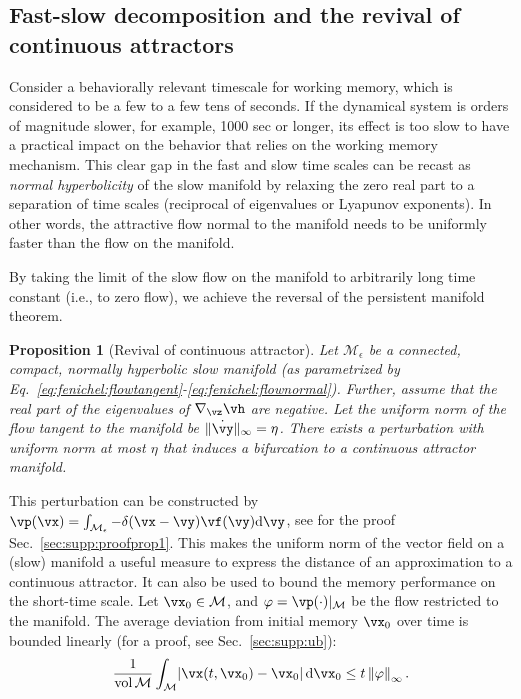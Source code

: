 \documentclass{article} %
\newcounter{ct}
\newcommand{\dm}[1]{\ensuremath{\mathrm{d}{#1}}} %
\newcommand{\manifold}{\mathcal{M}}
\newcommand{\uniformNorm}[1]{\left\|#1\right\|_\infty} %
\DeclarePairedDelimiter{\abs}{\lvert}{\rvert}
\newtheorem{prop}{Proposition}
\theoremstyle{definition}
\theoremstyle{remark}
\begin{document}
\subsection{Fast-slow decomposition and the revival of continuous attractors}\label{sec:revival}
Consider a behaviorally relevant  timescale for working memory, which is considered to be a few to a few tens of seconds.
If the dynamical system is orders of magnitude slower, for example, 1000 sec or longer, its effect is too slow to have a practical impact on the behavior that relies on the working memory mechanism.
This clear gap in the fast and slow time scales can be recast as \emph{normal hyperbolicity} of the slow manifold by relaxing the zero real part to a separation of time scales (reciprocal of eigenvalues or Lyapunov exponents).
In other words, the attractive flow normal to the manifold needs to be uniformly faster than the flow on the manifold.

By taking the limit of the slow flow on the manifold to arbitrarily long time constant (i.e., to zero flow), we achieve the reversal of the persistent manifold theorem.
\begin{prop}[Revival of continuous attractor]\label{prop:revival}
Let \(\manifold_\epsilon\) be a connected, compact, normally hyperbolic slow manifold  (as parametrized by Eq.~\eqref{eq:fenichel:flowtangent}-\eqref{eq:fenichel:flownormal}).
Further, assume that the real part of the eigenvalues of \(\nabla_\vz \vh\) are negative. %
Let the uniform norm of the flow tangent to the manifold be \(\|\dot \vy\|_\infty=\eta\).
There exists a perturbation with uniform norm at most \(\eta\) that induces a bifurcation to a continuous attractor manifold. %
\end{prop}

This perturbation can be constructed by \(\vp(\vx) = \int_{\manifold_\epsilon} - \delta(\vx-\vy)\vf(\vy)\dm{\vy}\), see for the proof Sec.~\ref{sec:supp:proofprop1}.
This makes the uniform norm of the vector field on a (slow) manifold a useful measure to express the distance of an approximation to a continuous attractor.
It can also be used to bound the memory performance on the short-time scale. %
Let \(\vx_0 \in \manifold\), and \(\varphi = \vp(\cdot)\vert_\manifold\) be the flow restricted to the manifold.
The average deviation from initial memory \(\vx_0\) over time is bounded linearly (for a proof, see Sec.~\ref{sec:supp:ub}):
\begin{align}\label{eq:distance:ub}
\frac{1}{\operatorname{vol}\manifold}\int_\manifold
\abs{\vx(t, \vx_0) - \vx_0}\,
\dm{\vx_0}
\leq t\uniformNorm{\varphi}.
\end{align}
\end{document}
